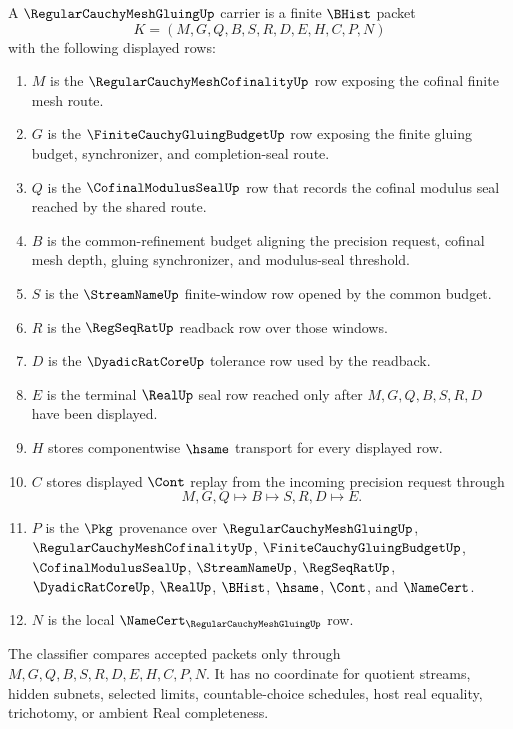 \begin{definition}
\label{def:regular-cauchy-mesh-gluing-carrier}
A $\RegularCauchyMeshGluingUp$ carrier is a finite $\BHist$ packet
$$
K=(M,G,Q,B,S,R,D,E,H,C,P,N)
$$
with the following displayed rows:
\begin{enumerate}
\item $M$ is the $\RegularCauchyMeshCofinalityUp$ row exposing the cofinal finite mesh route.
\item $G$ is the $\FiniteCauchyGluingBudgetUp$ row exposing the finite gluing budget, synchronizer, and completion-seal route.
\item $Q$ is the $\CofinalModulusSealUp$ row that records the cofinal modulus seal reached by the shared route.
\item $B$ is the common-refinement budget aligning the precision request, cofinal mesh depth, gluing synchronizer, and modulus-seal threshold.
\item $S$ is the $\StreamNameUp$ finite-window row opened by the common budget.
\item $R$ is the $\RegSeqRatUp$ readback row over those windows.
\item $D$ is the $\DyadicRatCoreUp$ tolerance row used by the readback.
\item $E$ is the terminal $\RealUp$ seal row reached only after $M,G,Q,B,S,R,D$ have been displayed.
\item $H$ stores componentwise $\hsame$ transport for every displayed row.
\item $C$ stores displayed $\Cont$ replay from the incoming precision request through
$$
M,G,Q \longmapsto B \longmapsto S,R,D \longmapsto E .
$$
\item $P$ is the $\Pkg$ provenance over $\RegularCauchyMeshGluingUp$, $\RegularCauchyMeshCofinalityUp$, $\FiniteCauchyGluingBudgetUp$, $\CofinalModulusSealUp$, $\StreamNameUp$, $\RegSeqRatUp$, $\DyadicRatCoreUp$, $\RealUp$, $\BHist$, $\hsame$, $\Cont$, and $\NameCert$.
\item $N$ is the local $\NameCert_{\RegularCauchyMeshGluingUp}$ row.
\end{enumerate}
The classifier compares accepted packets only through $M,G,Q,B,S,R,D,E,H,C,P,N$. It has no coordinate for quotient streams, hidden subnets, selected limits, countable-choice schedules, host real equality, trichotomy, or ambient Real completeness.
\end{definition}

